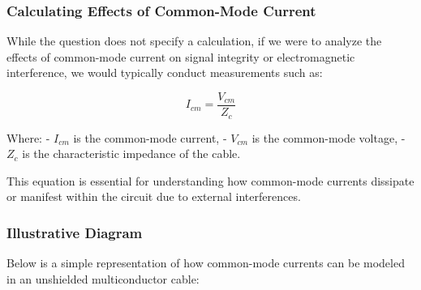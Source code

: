 \subsubsection{Calculating Effects of Common-Mode Current}
While the question does not specify a calculation, if we were to analyze the effects of common-mode current on signal integrity or electromagnetic interference, we would typically conduct measurements such as:

\[
I_{cm} = \frac{V_{cm}}{Z_{c}}
\]

Where:
- \( I_{cm} \) is the common-mode current,
- \( V_{cm} \) is the common-mode voltage,
- \( Z_{c} \) is the characteristic impedance of the cable.

This equation is essential for understanding how common-mode currents dissipate or manifest within the circuit due to external interferences.

\subsubsection{Illustrative Diagram}
Below is a simple representation of how common-mode currents can be modeled in an unshielded multiconductor cable:


